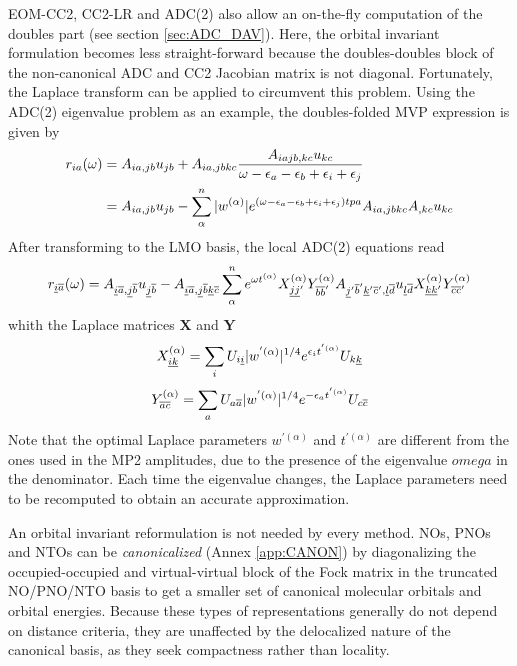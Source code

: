 EOM-CC2, CC2-LR and ADC(2) also allow an on-the-fly computation of the doubles part (see section \ref{sec:ADC_DAV}). Here, the orbital invariant formulation becomes less straight-forward because the doubles-doubles block of the non-canonical ADC and CC2 Jacobian matrix is not diagonal. Fortunately, the Laplace transform can be applied to circumvent this problem. Using the ADC(2) eigenvalue problem as an example, the doubles-folded MVP expression is given by
\begin{equation}
\begin{split}
r_{ia}(\omega) &= A_{ia,jb} u_{jb} + A_{ia,jbkc} \frac{A_{iajb,kc} u_{kc}}{\omega - \epsilon_a - \epsilon_b + \epsilon_i + \epsilon_j} \\
&= A_{ia,jb} u_{jb} - \sum_{\alpha}^{n} |w^{(\alpha)}| e^{\left(\omega - \epsilon_a - \epsilon_b + \epsilon_i + \epsilon_j\right) tpa} A_{ia,jbkc} A_{,kc} u_{kc} 
\end{split}
\end{equation}
After transforming to the LMO basis, the local ADC(2) equations read
\begin{equation}
r_{\underline{i} \overline{a}}(\omega) = A_{\underline{i} \overline{a}, \underline{j} \overline{b}} u_{\underline{j} \overline{b}} - A_{\underline{i} \overline{a}, \underline{j} \overline{b} \underline{k} \overline{c}} \sum_{\alpha}^{n} e^{\omega t^{(\alpha)}} X_{\underline{j} \underline{j}'}^{(\alpha)} Y_{\overline{b} \overline{b}'}^{(\alpha)} A_{\underline{j}' \overline{b}' \underline{k}' \overline{c}', \underline{l} \overline{d}} u_{\underline{l} \overline{d}} X_{\underline{k} \underline{k}'}^{(\alpha)} Y_{\overline{c} \overline{c}'}^{(\alpha)}  \\
\end{equation}
\noindent whith the Laplace matrices $\mathbf{X}$ and $\mathbf{Y}$ 
\begin{equation}
X_{\underline{i}\underline{k}}^{(\alpha)} = \sum_i U_{i\underline{i}} |w^{'(\alpha)}|^{1/4} e^{\epsilon_i t^{'(\alpha)}} U_{k\underline{k}}
\end{equation}
\begin{equation}
Y_{\overline{a}\overline{c}}^{(\alpha)} = \sum_a U_{a\overline{a}} |w^{'(\alpha)}|^{1/4} e^{-\epsilon_a t^{'(\alpha)}} U_{c\overline{c}}
\end{equation}
\noindent Note that the optimal Laplace parameters $w^{'(\alpha)}$ and $t^{'(\alpha)}$ are different from the ones used in the MP2 amplitudes, due to the presence of the eigenvalue $omega$ in the denominator. Each time the eigenvalue changes, the Laplace parameters need to be recomputed to obtain an accurate approximation. 

An orbital invariant reformulation is not needed by every method. NOs, PNOs and NTOs can be \emph{canonicalized} (Annex \ref{app:CANON}) by diagonalizing the occupied-occupied and virtual-virtual block of the Fock matrix in the truncated NO/PNO/NTO basis to get a smaller set of canonical molecular orbitals and orbital energies. Because these types of representations generally do not depend on distance criteria, they are unaffected by the delocalized nature of the canonical basis, as they seek compactness rather than locality. 

